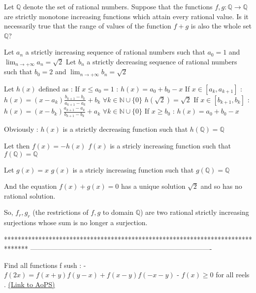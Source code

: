 \begin{solution}
	\begin{tcolorbox}Let $\mathbb Q$ denote the set of rational numbers. Suppose that the functions $f, g: \mathbb Q\to \mathbb Q$ are strictly monotone increasing functions which attain every rational value. Is it necessarily true that the range of values of the function $f+g$ is also the whole set $\mathbb Q$?\end{tcolorbox}
Let $a_n$ a strictly increasing sequence of rational numbers such that $a_0=1$ and $\lim_{n\to +\infty}a_n=\sqrt 2$
Let $b_n$ a strictly decreasing sequence of rational numbers such that $b_0=2$ and $\lim_{n\to +\infty}b_n=\sqrt 2$

Let $h(x)$ defined as :
If $x\le a_0=1$ : $h(x)=a_0+b_0-x$
If $x\in[a_k,a_{k+1}]$ : $h(x)=(x-a_k)\frac{b_{k+1}-b_k}{a_{k+1}-a_k}+b_k$ $\forall k\in\mathbb N\cup\{0\}$
$h(\sqrt 2)=\sqrt 2$
If $x\in[b_{k+1},b_k]$ : $h(x)=(x-b_k)\frac{a_{k+1}-a_k}{b_{k+1}-b_k}+a_k$ $\forall k\in\mathbb N\cup\{0\}$
If $x\ge b_0$ : $h(x)=a_0+b_0-x$

Obviously :
$h(x)$ is a strictly decreasing function such that $h(\mathbb Q)=\mathbb Q$

Let then $f(x)=-h(x)$
$f(x)$ is a stricly increasing function such that $f(\mathbb Q)=\mathbb Q$

Let $g(x)=x$
$g(x)$ is a stricly increasing function such that $g(\mathbb Q)=\mathbb Q$

And the equation $f(x)+g(x)=0$ has a unique solution $\sqrt 2$ and so has no rational solution.

So, $f_r,g_r$ (the restrictions of $f,g$ to domain $\mathbb Q$) are two rational strictly increasing surjections whose sum is no longer a surjection.
\end{solution}
*******************************************************************************
-------------------------------------------------------------------------------

\begin{problem}
	Find all functions f sush : 
 - $ f(2x) =f(x+y)f(y-x) + f(x-y)f(-x-y) $ 
 - $ f(x) \ge 0 $  for all reels .
	\flushright \href{https://artofproblemsolving.com/community/c6h611899}{(Link to AoPS)}
\end{problem}



